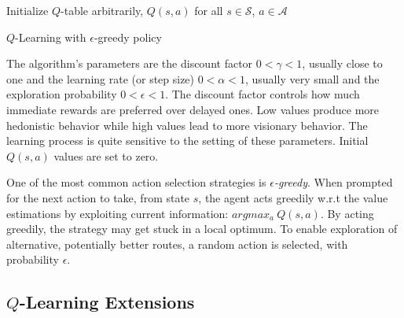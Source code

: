 \documentclass{article}
\begin{document}
\begin{algorithm}[!h]
Initialize $Q$-table arbitrarily, $Q(s, a)$ for all $s \in \mathcal{S}$, $a \in \mathcal{A}$\\

 \caption{$Q$-Learning with $\epsilon$-greedy policy}
 \label{alg:ql}
\end{algorithm}

The algorithm's parameters are the discount factor $0 < \gamma < 1$, usually close to one and the learning rate (or step size)  $0 < \alpha < 1$, usually very small and the exploration probability $0 < \epsilon < 1$. The discount factor controls how much immediate rewards are preferred over delayed ones. Low values produce more hedonistic behavior while high values lead to more visionary behavior. The learning process is quite sensitive to the setting of these parameters. Initial $Q(s, a)$ values are set to zero.

One of the most common action selection strategies is \textit{$\epsilon$-greedy}. When prompted for the next action to take, from state $s$, the agent acts greedily w.r.t the value estimations by exploiting current information: $argmax_a\ Q(s, a)$. By acting greedily, the strategy may get stuck in a local optimum. To enable exploration of alternative, potentially better routes, a random action is selected, with probability $\epsilon$.


\subsection{$Q$-Learning Extensions}
\label{subsec:qlp}
\end{document}
